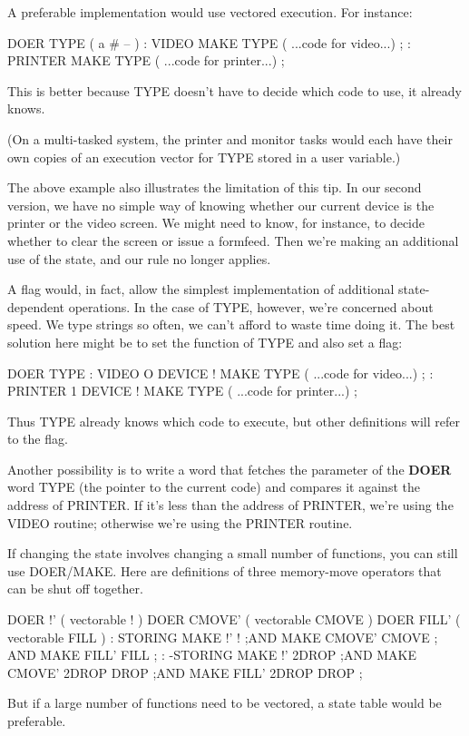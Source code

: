 A preferable implementation would use vectored execution. For
instance:

\begin{Code}
DOER TYPE  ( a # -- )
: VIDEO   MAKE TYPE ( ...code for video...) ;
: PRINTER   MAKE TYPE ( ...code for printer...) ;
\end{Code}
This is better because TYPE doesn't have to decide which code to use, it
already knows.

(On a multi-tasked system, the printer and monitor tasks would
each have their own copies of an execution vector for TYPE
stored in a user variable.)

The above example also illustrates the limitation of this tip. In our
second version, we have no simple way of knowing whether our current
device is the printer or the video screen. We might need to know, for
instance, to decide whether to clear the screen or issue a formfeed. Then
we're making an additional use of the state, and our rule no longer
applies.

A flag would, in fact, allow the simplest implementation of additional
state-dependent operations. In the case of TYPE, however, we're
concerned about speed. We type strings so often, we can't afford to waste
time doing it. The best solution here might be to set the function of
TYPE and also set a flag:

\begin{Code}
DOER TYPE
: VIDEO   O DEVICE !  MAKE TYPE
     ( ...code for video...) ;
: PRINTER   1 DEVICE !  MAKE TYPE
     ( ...code for printer...) ;
\end{Code}
Thus TYPE already knows which code to execute, but other definitions
will refer to the flag.

Another possibility is to write a word that fetches the parameter of
the \textbf{DOER} word TYPE (the pointer to the current code) and compares it
against the address of PRINTER. If it's less than the address of
PRINTER, we're using the VIDEO routine; otherwise we're using the
PRINTER routine.

If changing the state involves changing a small number of functions,
you can still use DOER/MAKE. Here are definitions of three
memory-move operators that can be shut off together.

\begin{Code}
DOER !'  ( vectorable ! )
DOER CMOVE'  ( vectorable CMOVE )
DOER FILL'  ( vectorable FILL )
: STORING   MAKE !' ! ;AND
            MAKE CMOVE'  CMOVE ; AND
            MAKE FILL'  FILL ;
: -STORING  MAKE !'  2DROP ;AND
            MAKE CMOVE'  2DROP DROP ;AND
            MAKE FILL'  2DROP DROP ;
\end{Code}
But if a large number of functions need to be vectored, a state table
would be preferable.

